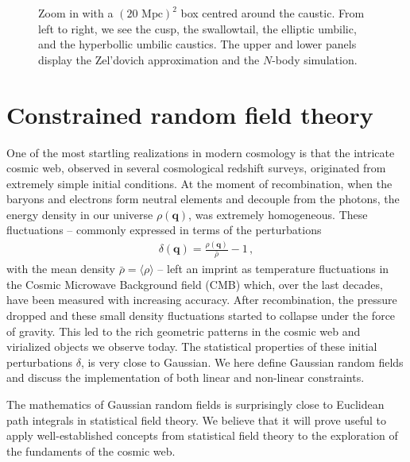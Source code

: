 \documentclass[a4paper, 11pt]{article}
\begin{document}
\begin{figure}
\begin{subfigure}[b]{0.24\textwidth}
\end{subfigure}
\caption{Zoom in with a $(20 \text{ Mpc})^2$ box centred around the caustic. From left to right, we see the cusp, the swallowtail, the elliptic umbilic, and the hyperbollic umbilic caustics. The upper and lower panels display the Zel'dovich approximation and the $N$-body simulation.}\label{fig:caustics_Examples_Small}
\end{figure}



\section{Constrained random field theory}
One of the most startling realizations in modern cosmology is that the intricate cosmic web, observed in several cosmological redshift surveys, originated from extremely simple initial conditions. At the moment of recombination, when the baryons and electrons form neutral elements and decouple from the photons, the energy density in our universe $\rho(\bm{q})$, was extremely homogeneous. These fluctuations -- commonly expressed in terms of the perturbations
\begin{align}
\delta(\bm{q}) = \frac{\rho(\bm{q})}{\bar{\rho}} -1\,,
\end{align}
with the mean density $\bar{\rho} = \langle \rho \rangle$ -- left an imprint as temperature fluctuations in the Cosmic Microwave Background field (CMB) which, over the last decades, have been measured with increasing accuracy. After recombination, the pressure dropped and these small density fluctuations started to collapse under the force of gravity. This led to the rich geometric patterns in the cosmic web and virialized objects we observe today. The statistical properties of these initial perturbations $\delta$, is very close to Gaussian. We here define Gaussian random fields and discuss the implementation of both linear and non-linear constraints.

\begin{framed}
The mathematics of Gaussian random fields is surprisingly close to Euclidean path integrals in statistical field theory. We believe that it will prove useful to apply well-established concepts from statistical field theory to the exploration of the fundaments of the cosmic web.
\end{framed}

\end{document}
